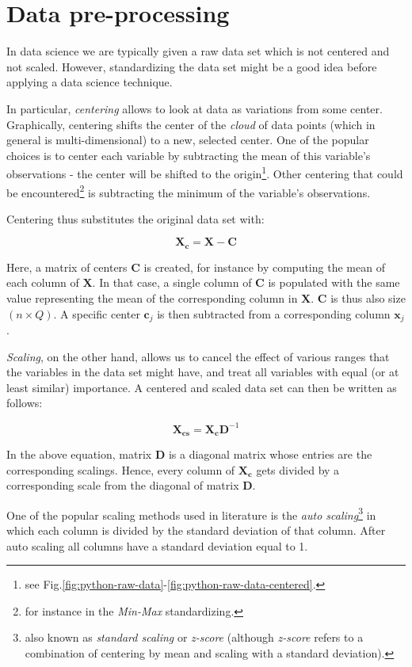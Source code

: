 \documentclass[10pt,twocolumn]{article}
\begin{document}
\section{Data pre-processing}

In data science we are typically given a raw data set which is not centered and not scaled. However, standardizing the data set might be a good idea before applying a data science technique.

In particular, \textit{centering} allows to look at data as variations from some center. Graphically, centering shifts the center of the \textit{cloud} of data points (which in general is multi-dimensional) to a new, selected center. One of the popular choices is to center each variable by subtracting the mean of this variable's observations - the center will be shifted to the origin\footnote{see Fig.\ref{fig:python-raw-data}-\ref{fig:python-raw-data-centered}.}.
Other centering that could be encountered\footnote{for instance in the \textit{Min-Max} standardizing.} is subtracting the minimum of the variable's observations.

Centering thus substitutes the original data set with:

\begin{equation}
\bm{X_c} = \bm{X} - \bm{C}
\end{equation}

Here, a matrix of centers $\bm{C}$ is created, for instance by computing the mean of each column of $\bm{X}$. In that case, a single column of $\bm{C}$ is populated with the same value representing the mean of the corresponding column in $\bm{X}$. $\bm{C}$ is thus also size $(n \times Q)$. A specific center $\bm{c}_j$ is then subtracted from a corresponding column $\bm{x}_j$.

\textit{Scaling}, on the other hand, allows us to cancel the effect of various ranges that the variables in the data set might have, and treat all variables with equal (or at least similar) importance. A centered and scaled data set can then be written as follows:

\begin{equation}
\bm{X_{cs}} = \bm{X_c}\bm{D}^{-1}
\end{equation}

In the above equation, matrix $\bm{D}$ is a diagonal matrix whose entries are the corresponding scalings. Hence, every column of $\bm{X_c}$ gets divided by a corresponding scale from the diagonal of matrix $\bm{D}$.

One of the popular scaling methods used in literature is the \textit{auto scaling}\footnote{also known as \textit{standard scaling} or \textit{z-score} (although \textit{z-score} refers to a combination of centering by mean and scaling with a standard deviation).} in which each column is divided by the standard deviation of that column. After auto scaling all columns have a standard deviation equal to 1.
\end{document}
